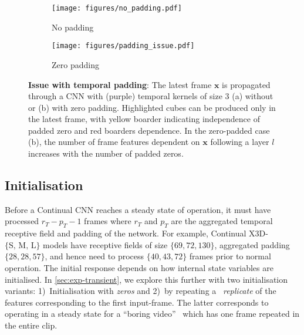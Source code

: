 \vspace{-10pt}
\begin{figure}[t]
     \centering
     \begin{subfigure}[b]{0.48\linewidth}
         \centering
         \texttt{[image: figures/no\_padding.pdf]}
         \caption{No padding}
         \label{fig:no_pad}
     \end{subfigure}
     \hfill
     \begin{subfigure}[b]{0.48\linewidth}
         \centering
         \texttt{[image: figures/padding\_issue.pdf]}
         \caption{Zero padding}
         \label{fig:padding_issue}
     \end{subfigure}
        \vspace{-5pt}
        \caption{\textbf{Issue with temporal padding}: The latest frame $\mathbf{x}$ is propagated through a CNN with (purple) temporal kernels of size 3 (a) without or (b) with zero padding. Highlighted cubes can be produced only in the latest frame, with yellow boarder indicating independence of padded zero and red boarders dependence. In the zero-padded case (b), the number of frame features dependent on $\mathbf{x}$ following a layer $l$ increases with the number of padded zeros.}
        \label{fig:padding}
        \vspace{-5mm}
\end{figure}


\subsection{Initialisation}\label{sec:init}
Before a Continual CNN reaches a steady state of operation, it must have processed $r_T - p_T - 1$ frames where $r_T$ and $p_T$ are the aggregated temporal receptive field and padding of the network.
For example, Continual X3D-${\{\text{S, M, L}\}}$ models have receptive fields of size $\{69, 72, 130\}$, aggregated padding $\{28, 28, 57\}$, and hence need to process $\{40, 43, 72\}$ frames prior to normal operation.
The initial response depends on how internal state variables are initialised. In \cref{sec:exp-transient}, we explore this further with two initialisation variants: 
1)~Initialisation with \textit{zeros} and 
2)~by repeating a ~\textit{replicate} of the features corresponding to the first input-frame. 
The latter corresponds to operating in a steady state for a ``boring video''~\cite{carreira2017quo} which has one frame repeated in the entire clip.

